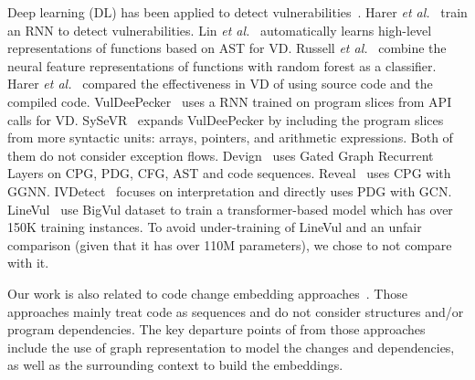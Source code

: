 Deep learning (DL) has been applied
to detect
vulnerabilities~\cite{li2021vulnerability,zhou2019devign,li2021vuldeelocator,li2020automated,chakraborty2021deep,hin2022linevd,scandariato2014predicting,neuhaus2007predicting,shin2010evaluating,neuhaus2009beauty,yamaguchi2012generalized,yamaguchi2011vulnerability}.
Harer {\em et al.}~\cite{harer2018learning} train an RNN to detect
vulnerabilities. Lin {\em et al.}~\cite{lin2017poster} automatically
learns high-level representations of functions based on AST for
VD. Russell {\em et al.}~\cite{russell2018automated} combine the
neural feature representations of functions with random forest as a
classifier.
Harer {\em et al.}~\cite{harer2018automated} compared the
effectiveness in VD of using source code and the compiled
code. VulDeePecker~\cite{li2018vuldeepecker} uses a RNN trained on
program slices from API calls for VD. SySeVR~\cite{li2021sysevr}
expands VulDeePecker by including the program slices from more
syntactic units: arrays, pointers, and arithmetic expressions. Both of
them do not consider exception flows. Devign~\cite{zhou2019devign}
uses Gated Graph Recurrent Layers on CPG, PDG, CFG, AST and code
sequences. Reveal~\cite{chakraborty2020deep} uses CPG with
GGNN. IVDetect~\cite{fse21} focuses on interpretation and directly
uses PDG with GCN. LineVul~\cite{linevul-msr22} use BigVul dataset to
train a transformer-based model which has over 150K training
instances. To avoid under-training of LineVul and an unfair comparison
(given that it has over 110M parameters), we chose to not compare with
it.

Our work is also related to code change embedding
approaches~\cite{cc2vec,commit2vec}. Those approaches mainly treat
code as sequences and do not consider structures and/or program
dependencies. The key departure points of {\tool} from those
approaches include the use of graph representation to model the
changes and dependencies, as well as the surrounding context to build
the embeddings.





